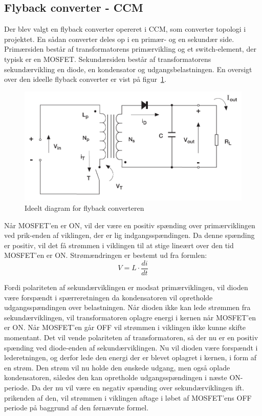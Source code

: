 
\subsection{Flyback converter - CCM}
Der blev valgt en flyback converter opereret i CCM, som converter topologi i projektet. En sådan converter deles op i en primær- og en sekundær side. Primærsiden består af transformatorens primærvikling og et switch-element, der typisk er en MOSFET. Sekundærsiden består af transformatorens sekundærvikling en diode, en kondensator og udgangsbelastningen. En oversigt over den ideelle flyback converter er vist på figur~\ref{fig:flyabck_ideal}. 

\begin{figure}[H]
	\centering
	\includegraphics[width=0.7\linewidth]{../Dokumentation/tex/1iteration/billeder/flyback_ideal.png}
	\caption{Ideelt diagram for flyback converteren
		\cite{SMPS-topologies}}
	\label{fig:flyabck_ideal}
\end{figure}

\noindent Når MOSFET'en er ON, vil der være en positiv spænding over primærviklingen ved prik-enden af viklingen, der er lig indgangsspændingen. Da denne spænding er positiv, vil det få strømmen i viklingen til at stige lineært over den tid MOSFET'en er ON. Strømændringen er bestemt ud fra formlen:
\begin{equation}
V = L \cdot \frac{di}{dt}
\end{equation}

Fordi polariteten af sekundærviklingen er modsat primærviklingen, vil dioden være forspændt i spærreretningen da kondensatoren vil opretholde udgangsspændingen over belastningen. Når dioden ikke kan lede strømmen fra sekundærviklingen, vil transformatoren oplagre energi i kernen når MOSFET'en er ON. Når MOSFET'en går OFF vil strømmen i viklingen ikke kunne skifte momentant. Det vil vende polariteten af transformatoren, så der nu er en positiv spænding ved diode-enden af sekundærviklingen. Nu vil dioden være forspændt i lederetningen, og derfor lede den energi der er blevet oplagret i kernen, i form af en strøm. Den strøm vil nu holde den ønskede udgang, men også oplade kondensatoren, således den kan opretholde udgangsspændingen i næste ON-periode. Da der nu vil være en negativ spænding over sekundærviklingen ift. prikenden af den, vil strømmen i viklingen aftage i løbet af MOSFET'ens OFF periode på baggrund af den førnævnte formel. 

